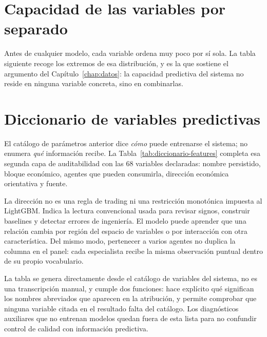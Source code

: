 \section{Capacidad de las variables por separado}

Antes de cualquier modelo, cada variable ordena muy poco por sí sola. La tabla siguiente recoge los
extremos de esa distribución, y es la que sostiene el argumento del Capítulo~\ref{chap:datos}: la
capacidad predictiva del sistema no reside en ninguna variable concreta, sino en combinarlas.

\begin{table}[htbp]
  \centering
  \small
  \caption{Variables con mayor y menor Rank-IC univariante.}
  \label{tab:features-top}
  
  \caption*{Doce primeras y cinco últimas de las 73 series con diagnóstico calculado, ordenadas por
  Rank-IC univariante. Esas 73 no coinciden con las \NumPredictores{} que declara el catálogo: 66 son
  comunes, siete son componentes derivados que el catálogo no declara por separado y dos variables
  declaradas no llegan a tener diagnóstico, de modo que la unión de ambas listas ---la que audita el
  exportador--- suma \NumDiagnosticos{} filas. Ninguna aparece marcada como podada, así que la tabla
  describe el catálogo declarado y no qué variables sobrevivieron a la poda por estabilidad.}
\end{table}

\section{Diccionario de variables predictivas}
\label{sec:diccionario-features}

El catálogo de parámetros anterior dice \emph{cómo} puede entrenarse el sistema; no enumera
\emph{qué} información recibe. La Tabla~\ref{tab:diccionario-features} completa esa segunda capa de
auditabilidad con las 68 variables declaradas: nombre persistido, bloque económico, agentes que
pueden consumirla, dirección económica orientativa y fuente.

La dirección no es una regla de trading ni una restricción monotónica impuesta al LightGBM. Indica
la lectura convencional usada para revisar signos, construir baselines y detectar errores de
ingeniería. El modelo puede aprender que una relación cambia por región del espacio de variables o
por interacción con otra característica. Del mismo modo, pertenecer a varios agentes no duplica la
columna en el panel: cada especialista recibe la misma observación puntual dentro de su propio
vocabulario.

{\scriptsize\renewcommand{\_}{\textunderscore\allowbreak}

}

La tabla se genera directamente desde el catálogo de variables del sistema, no es una transcripción
manual, y cumple dos funciones: hace explícito qué significan los nombres abreviados que aparecen en
la atribución, y permite comprobar que ninguna variable citada en el resultado falta del catálogo.
Los diagnósticos auxiliares que no entrenan modelos quedan fuera de esta lista para no confundir
control de calidad con información predictiva.
